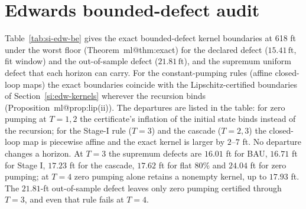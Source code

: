 \documentclass[11pt,a4paper]{article}
\makeatletter
\newcommand{\ft}{\,\mathrm{ft}}
\newcommand{\mref}[1]{\csname ml@#1\endcsname}
\makeatother
\begin{document}
\section{Edwards bounded-defect audit}\label{si:edw-be}
Table~\ref{tab:si-edw-be} gives the exact bounded-defect kernel boundaries at 618 ft under the worst floor (Theorem~\mref{thm:exact}) for the declared defect ($15.41\ft$, fit window) and the out-of-sample defect ($21.81\ft$), and the supremum uniform defect that each horizon can carry. For the constant-pumping rules (affine closed-loop maps) the exact boundaries coincide with the Lipschitz-certified boundaries of Section~\ref{si:edw-kernels} wherever the recursion binds (Proposition~\mref{prop:lip}(ii)). The departures are listed in the table: for zero pumping at $T=1,2$ the certificate's inflation of the initial state binds instead of the recursion; for the Stage-I rule ($T=3$) and the cascade ($T=2,3$) the closed-loop map is piecewise affine and the exact kernel is larger by $2$--$7$ ft. No departure changes a horizon. At $T=3$ the supremum defects are $16.01$ ft for BAU, $16.71$ ft for Stage I, $17.23$ ft for the cascade, $17.62$ ft for flat 80\% and $24.04$ ft for zero pumping; at $T=4$ zero pumping alone retains a nonempty kernel, up to $17.93$ ft. The $21.81$-ft out-of-sample defect leaves only zero pumping certified through $T=3$, and even that rule fails at $T=4$.
\end{document}
